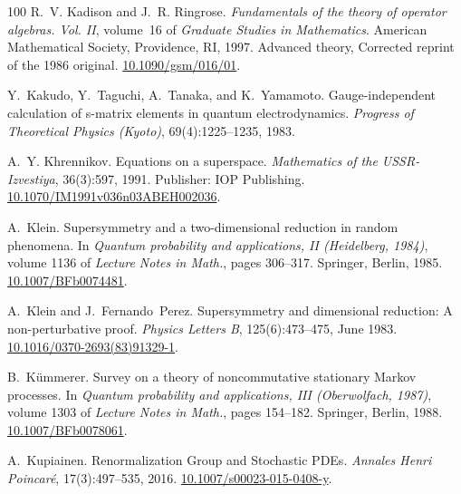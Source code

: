 \documentclass[11pt]{article}
\newcommand{\tmtextit}[1]{{\itshape{#1}}}
\begin{document}
\begin{thebibliography}{100}
  R.~V. Kadison and J.~R. Ringrose.
  {\newblock}\tmtextit{Fundamentals of the theory of operator algebras. Vol.
  II}, volume~16 of \tmtextit{Graduate Studies in Mathematics}.
  {\newblock}American Mathematical Society, Providence, RI, 1997.
  {\newblock}Advanced theory, Corrected reprint of the 1986 original.
  \href{https://doi.org/10.1090/gsm/016/01}{10.1090/gsm/016/01}.
  
  Y.~Kakudo, Y.~Taguchi, A.~Tanaka, and
  K.~Yamamoto. {\newblock}Gauge-independent calculation of s-matrix elements
  in quantum electrodynamics. {\newblock}\tmtextit{Progress of Theoretical
  Physics (Kyoto)}, 69(4):1225--1235, 1983.
  
  A.~Y. Khrennikov.
  {\newblock}Equations on a superspace. {\newblock}\tmtextit{Mathematics of
  the USSR-Izvestiya}, 36(3):597, 1991. {\newblock}Publisher: IOP Publishing.
  \href{https://doi.org/10.1070/IM1991v036n03ABEH002036}{10.1070/IM1991v036n03ABEH002036}.
  
  A.~Klein. {\newblock}Supersymmetry and
  a two-dimensional reduction in random phenomena. {\newblock}In
  \tmtextit{Quantum probability and applications, II (Heidelberg, 1984)},
  volume 1136 of \tmtextit{Lecture Notes in Math.}, pages 306--317. Springer,
  Berlin, 1985.
  {\newblock}\href{https://doi.org/10.1007/BFb0074481}{10.1007/BFb0074481}.
  
  A.~Klein and J.~Fernando~Perez.
  {\newblock}Supersymmetry and dimensional reduction: A non-perturbative
  proof. {\newblock}\tmtextit{Physics Letters B}, 125(6):473--475, June 1983.
  {\newblock}
  \href{https://doi.org/10.1016/0370-2693(83)91329-1}{10.1016/0370-2693(83)91329-1}.
  
  B.~K{\"u}mmerer. {\newblock}Survey on a theory of
  noncommutative stationary Markov processes. {\newblock}In \tmtextit{Quantum
  probability and applications, III (Oberwolfach, 1987)}, volume 1303 of
  \tmtextit{Lecture Notes in Math.}, pages 154--182. Springer, Berlin, 1988.
  {\newblock}\href{https://doi.org/10.1007/BFb0078061}{10.1007/BFb0078061}.
  
  A.~Kupiainen.
  {\newblock}Renormalization Group and Stochastic PDEs.
  {\newblock}\tmtextit{Annales Henri Poincar{\'e}}, 17(3):497--535, 2016.
  {\newblock}
  \href{https://doi.org/10.1007/s00023-015-0408-y}{10.1007/s00023-015-0408-y}.
  

\end{thebibliography}
\end{document}

